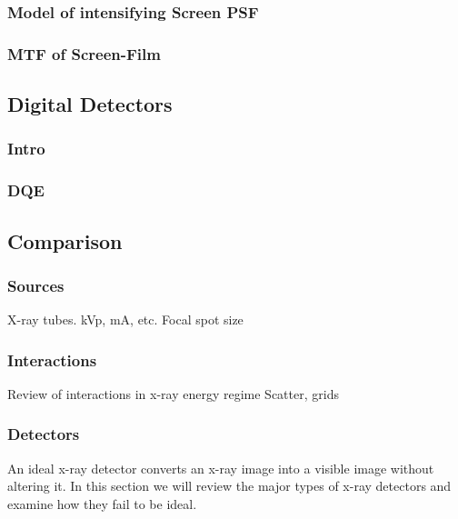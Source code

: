 \documentclass[mphy386-notes.tex]{subfiles}
\begin{document}
\subsubsection{Model of intensifying Screen PSF}
\subsubsection{MTF of Screen-Film}
\subsection{Digital Detectors}
\subsubsection{Intro}
\subsubsection{DQE}
\subsection{Comparison}

\subsubsection{Sources}
X-ray tubes.
kVp, mA, etc.
Focal spot size

\subsubsection{Interactions}
Review of interactions in x-ray energy regime
Scatter, grids

\subsubsection{Detectors}
An ideal x-ray detector converts an x-ray image into a visible image without
altering it. In this section we will review the major types of x-ray detectors
and examine how they fail to be ideal.
\end{document}
